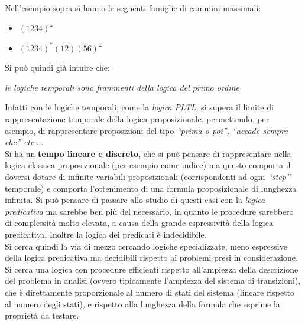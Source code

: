 \begin{esempio}
  Nell'esempio sopra si hanno le seguenti famiglie di cammini massimali:
  \begin{itemize}
    \item $(1234)^\omega$
    \item $(1234)^{*}(12)(56)^\omega$
  \end{itemize}
\end{esempio}
Si può quindi già intuire che:
\begin{center}
  \textit{le logiche temporali sono frammenti della logica del primo ordine}
\end{center}
Infatti con le logiche temporali, come la \textit{logica PLTL}, si supera il
limite di rappresentazione temporale della logica proposizionale, permettendo,
per esempio, di rappresentare proposizioni del tipo \textit{``prima o poi'',
  ``accade sempre che'' etc$\ldots$}.\\
Si ha un \textbf{tempo lineare e discreto}, che si può pensare di rappresentare
nella logica classica proposizionale (per esempio come indice) ma questo
comporta il doversi dotare di infinite variabili proposizionali (corrispondenti
ad ogni \textit{``step''} temporale) e comporta l'ottenimento di una formula
proposizionale di lunghezza infinita. Si può pensare di passare allo studio di
questi casi con la \textit{logica predicativa} ma sarebbe ben più del
necessario, in quanto le procedure sarebbero di complessità molto elevata, a
causa della grande espressività della logica predicativa. Inoltre la logica dei
predicati è indecidibile. \\
Si cerca quindi la via di mezzo cercando logiche specializzate, meno espressive
della logica predicativa ma decidibili rispetto ai problemi presi in
considerazione. Si cerca una logica con procedure efficienti rispetto
all'ampiezza della descrizione del problema in analisi (ovvero tipicamente
l'ampiezza del sistema di transizioni), che è direttamente proporzionale al
numero di stati del sistema (lineare rispetto al numero degli stati), e rispetto
alla lunghezza della formula che esprime la proprietà da testare.

